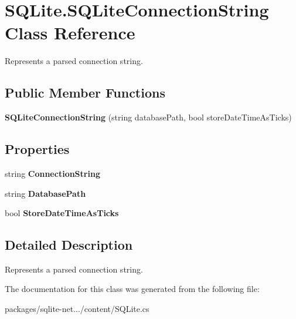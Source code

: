 \hypertarget{classSQLite_1_1SQLiteConnectionString}{}\section{S\+Q\+Lite.\+S\+Q\+Lite\+Connection\+String Class Reference}
\label{classSQLite_1_1SQLiteConnectionString}


Represents a parsed connection string.  


\subsection*{Public Member Functions}
\begin{DoxyCompactItemize}
\item 
\hypertarget{classSQLite_1_1SQLiteConnectionString_ae5ec4b3dabdbb7c581d0931382fb06ef}{}{\bfseries S\+Q\+Lite\+Connection\+String} (string database\+Path, bool store\+Date\+Time\+As\+Ticks)\label{classSQLite_1_1SQLiteConnectionString_ae5ec4b3dabdbb7c581d0931382fb06ef}

\end{DoxyCompactItemize}
\subsection*{Properties}
\begin{DoxyCompactItemize}
\item 
\hypertarget{classSQLite_1_1SQLiteConnectionString_aeafe2630ba2871c730f2ea6b7cbcc15a}{}string {\bfseries Connection\+String}\label{classSQLite_1_1SQLiteConnectionString_aeafe2630ba2871c730f2ea6b7cbcc15a}

\item 
\hypertarget{classSQLite_1_1SQLiteConnectionString_aa5fb18dd049e2f5ca930f9023525734d}{}string {\bfseries Database\+Path}\label{classSQLite_1_1SQLiteConnectionString_aa5fb18dd049e2f5ca930f9023525734d}

\item 
\hypertarget{classSQLite_1_1SQLiteConnectionString_a1736975db702ccd8375cc77949511ff3}{}bool {\bfseries Store\+Date\+Time\+As\+Ticks}\label{classSQLite_1_1SQLiteConnectionString_a1736975db702ccd8375cc77949511ff3}

\end{DoxyCompactItemize}


\subsection{Detailed Description}
Represents a parsed connection string. 



The documentation for this class was generated from the following file\+:\begin{DoxyCompactItemize}
\item 
packages/sqlite-\/net.../content/S\+Q\+Lite.\+cs\end{DoxyCompactItemize}
